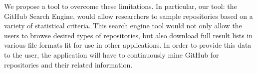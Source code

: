We propose a tool to overcome these limitations.
In particular, our tool: the GitHub Search Engine, would allow researchers to sample repositories based on a variety of statistical criteria.
This search engine tool would not only allow the users to browse desired types of repositories, but also download full result lists in various file formats fit for use in other applications.
In order to provide this data to the user, the application will have to continuously mine GitHub for repositories and their related information.